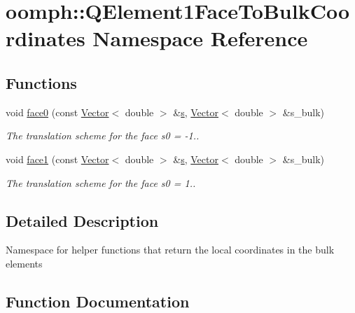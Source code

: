 \hypertarget{namespaceoomph_1_1QElement1FaceToBulkCoordinates}{}\section{oomph\+:\+:Q\+Element1\+Face\+To\+Bulk\+Coordinates Namespace Reference}
\label{namespaceoomph_1_1QElement1FaceToBulkCoordinates}
\subsection*{Functions}
\begin{DoxyCompactItemize}
\item 
void \hyperlink{namespaceoomph_1_1QElement1FaceToBulkCoordinates_ac2d60a1336c3ef162cc4988637e39c7f}{face0} (const \hyperlink{classoomph_1_1Vector}{Vector}$<$ double $>$ \&\hyperlink{cfortran_8h_ab7123126e4885ef647dd9c6e3807a21c}{s}, \hyperlink{classoomph_1_1Vector}{Vector}$<$ double $>$ \&s\+\_\+bulk)
\begin{DoxyCompactList}\small\item\em The translation scheme for the face s0 = -\/1.. \end{DoxyCompactList}\item 
void \hyperlink{namespaceoomph_1_1QElement1FaceToBulkCoordinates_a50a127a1f2d888860d1edfd993807656}{face1} (const \hyperlink{classoomph_1_1Vector}{Vector}$<$ double $>$ \&\hyperlink{cfortran_8h_ab7123126e4885ef647dd9c6e3807a21c}{s}, \hyperlink{classoomph_1_1Vector}{Vector}$<$ double $>$ \&s\+\_\+bulk)
\begin{DoxyCompactList}\small\item\em The translation scheme for the face s0 = 1.. \end{DoxyCompactList}\end{DoxyCompactItemize}


\subsection{Detailed Description}
Namespace for helper functions that return the local coordinates in the bulk elements 

\subsection{Function Documentation}
\mbox{\label{namespaceoomph_1_1QElement1FaceToBulkCoordinates_ac2d60a1336c3ef162cc4988637e39c7f}} 
